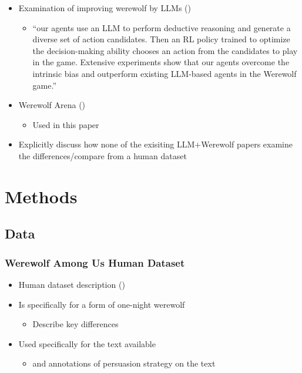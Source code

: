 \documentclass[
  letterpaper,
  DIV=11,
  numbers=noendperiod]{scrreprt}
\providecommand{\tightlist}{%
  \setlength{\itemsep}{0pt}\setlength{\parskip}{0pt}}
\begin{document}
\begin{itemize}
\tightlist
\item
  Examination of improving werewolf by LLMs
  ()

  \begin{itemize}
  \tightlist
  \item
    ``our agents use an LLM to perform deductive reasoning and generate
    a diverse set of action candidates. Then an RL policy trained to
    optimize the decision-making ability chooses an action from the
    candidates to play in the game. Extensive experiments show that our
    agents overcome the intrinsic bias and outperform existing LLM-based
    agents in the Werewolf game.''
  \end{itemize}
\item
  Werewolf Arena ()

  \begin{itemize}
  \tightlist
  \item
    Used in this paper
  \end{itemize}
\item
  Explicitly discuss how none of the exisiting LLM+Werewolf papers
  examine the differences/compare from a human dataset
\end{itemize}

\chapter{Methods}\label{methods}

\section{Data}\label{data}

\subsection{Werewolf Among Us Human
Dataset}\label{werewolf-among-us-human-dataset}

\begin{itemize}
\tightlist
\item
  Human dataset description
  ()
\item
  Is specifically for a form of one-night werewolf

  \begin{itemize}
  \tightlist
  \item
    Describe key differences
  \end{itemize}
\item
  Used specifically for the text available

  \begin{itemize}
  \tightlist
  \item
    and annotations of persuasion strategy on the text
  \end{itemize}
\end{itemize}
\end{document}
